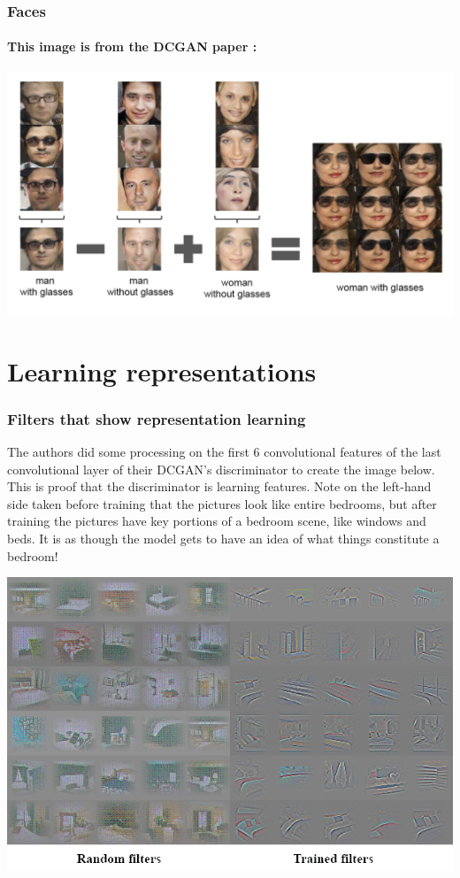 \documentclass{beamer}
\begin{document}
\begin{frame}
\frametitle{Faces}
\framesubtitle{This image is from the DCGAN paper \cite{repLearnDcgan}:}
\includegraphics[scale=0.25]{woman-with-glasses}
\end{frame}


\section{Learning representations}

\begin{frame}
\frametitle{Filters that show representation learning}
\begin{tiny}
The authors did some processing on the first 6 convolutional features of the
last convolutional layer of their DCGAN's discriminator to create the image below.  
This is proof that the discriminator  is learning features.  Note on the
left-hand side taken before training that the pictures look like entire bedrooms,
but after training the pictures have key portions of a bedroom scene, like windows
and beds.  It is as though the model gets to have an idea of what things constitute
a bedroom!
\end{tiny}
\includegraphics[scale=0.35] {feature-maps}
\end{frame}
\end{document}
